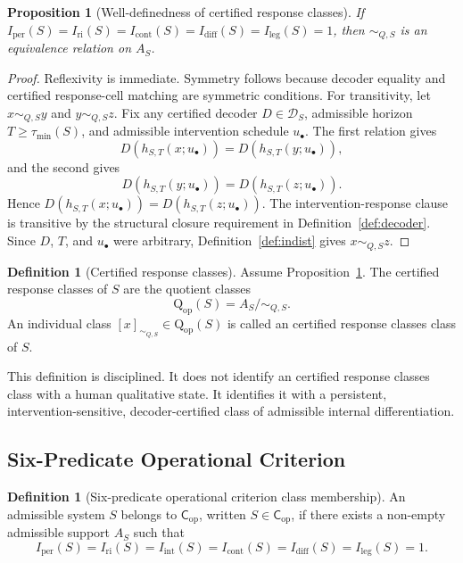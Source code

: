 \documentclass[11pt,a4paper]{article}
\newtheorem{proposition}[theorem]{Proposition}
\theoremstyle{definition}
\newtheorem{definition}[theorem]{Definition}
\newcommand{\Cop}{\mathsf{C}_{\mathrm{op}}}
\newcommand{\Qop}{\mathrm{Q}_{\mathrm{op}}}
\newcommand{\Iper}{I_{\mathrm{per}}}
\newcommand{\Iri}{I_{\mathrm{ri}}}
\newcommand{\Iint}{I_{\mathrm{int}}}
\newcommand{\Icont}{I_{\mathrm{cont}}}
\newcommand{\Idiff}{I_{\mathrm{diff}}}
\newcommand{\Ileg}{I_{\mathrm{leg}}}
\newcommand{\Aset}{A_S}
\newcommand{\Dec}{\mathscr{D}}
\begin{document}
\begin{proposition}[Well-definedness of certified response classes]\label{prop:qop-welldefined}
If $\Iper(S)=\Iri(S)=\Icont(S)=\Idiff(S)=\Ileg(S)=1$, then $\sim_{Q,S}$ is an equivalence relation on $\Aset$.
\end{proposition}

\begin{proof}
Reflexivity is immediate. Symmetry follows because decoder equality and certified response-cell matching are symmetric conditions. For transitivity, let $x \sim_{Q,S} y$ and $y \sim_{Q,S} z$. Fix any certified decoder $D\in\Dec_S$, admissible horizon $T\ge\tau_{\min}(S)$, and admissible intervention schedule $u_\bullet$. The first relation gives
\[
D(h_{S,T}(x;u_\bullet))=D(h_{S,T}(y;u_\bullet)),
\]
and the second gives
\[
D(h_{S,T}(y;u_\bullet))=D(h_{S,T}(z;u_\bullet)).
\]
Hence $D(h_{S,T}(x;u_\bullet))=D(h_{S,T}(z;u_\bullet))$. The intervention-response clause is transitive by the structural closure requirement in Definition~\ref{def:decoder}. Since $D$, $T$, and $u_\bullet$ were arbitrary, Definition~\ref{def:indist} gives $x \sim_{Q,S} z$.
\end{proof}

\begin{definition}[Certified response classes]\label{def:qop}
Assume Proposition~\ref{prop:qop-welldefined}. The certified response classes of $S$ are the quotient classes
\[
\Qop(S) = \Aset / {\sim_{Q,S}}.
\]
An individual class $[x]_{\sim_{Q,S}} \in \Qop(S)$ is called an certified response classes class of $S$.
\end{definition}

This definition is disciplined. It does not identify an certified response classes class with a human qualitative state. It identifies it with a persistent, intervention-sensitive, decoder-certified class of admissible internal differentiation.

\subsection{Six-Predicate Operational Criterion}
\begin{definition}[Six-predicate operational criterion class membership]\label{def:cop}
An admissible system $S$ belongs to $\Cop$, written $S \in \Cop$, if there exists a non-empty admissible support $\Aset$ such that
\[
\Iper(S)=\Iri(S)=\Iint(S)=\Icont(S)=\Idiff(S)=\Ileg(S)=1.
\]
\end{definition}
\end{document}
